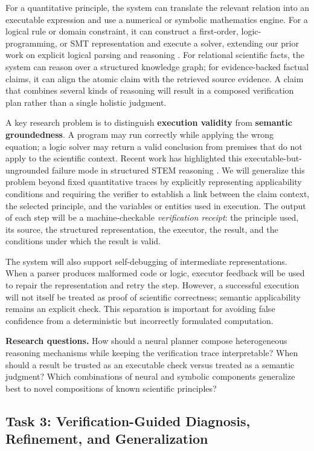 \documentclass[12pt]{article}
\begin{document}
For a quantitative principle, the system can translate the relevant relation into an executable expression and use a numerical or symbolic mathematics engine. For a logical rule or domain constraint, it can construct a first-order, logic-programming, or SMT representation and execute a solver, extending our prior work on explicit logical parsing and reasoning \citep{han2023clore}. For relational scientific facts, the system can reason over a structured knowledge graph; for evidence-backed factual claims, it can align the atomic claim with the retrieved source evidence. A claim that combines several kinds of reasoning will result in a composed verification plan rather than a single holistic judgment.

A key research problem is to distinguish \textbf{execution validity} from \textbf{semantic groundedness}. A program may run correctly while applying the wrong equation; a logic solver may return a valid conclusion from premises that do not apply to the scientific context. Recent work has highlighted this executable-but-ungrounded failure mode in structured STEM reasoning \citep{zi2026nsprm}. We will generalize this problem beyond fixed quantitative traces by explicitly representing applicability conditions and requiring the verifier to establish a link between the claim context, the selected principle, and the variables or entities used in execution. The output of each step will be a machine-checkable \emph{verification receipt}: the principle used, its source, the structured representation, the executor, the result, and the conditions under which the result is valid.

The system will also support self-debugging of intermediate representations. When a parser produces malformed code or logic, executor feedback will be used to repair the representation and retry the step. However, a successful execution will not itself be treated as proof of scientific correctness; semantic applicability remains an explicit check. This separation is important for avoiding false confidence from a deterministic but incorrectly formulated computation.

\textbf{Research questions.} How should a neural planner compose heterogeneous reasoning mechanisms while keeping the verification trace interpretable? When should a result be trusted as an executable check versus treated as a semantic judgment? Which combinations of neural and symbolic components generalize best to novel compositions of known scientific principles?

\subsection*{Task 3: Verification-Guided Diagnosis, Refinement, and Generalization}
\end{document}
